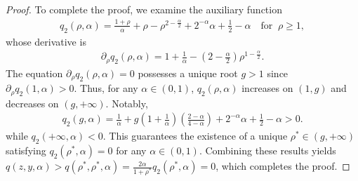 \documentclass{siamart171218}
\theoremstyle{remark}
\theoremstyle{example}
\numberwithin{equation}{section}
\begin{document}
\begin{proof}
To complete the proof, we examine the auxiliary function
\begin{align*}
    q_2(\rho,\alpha)=\frac{1+\rho}{\alpha}+\rho-\rho^{2-\frac{\alpha}{2}}
    +2^{-\alpha}\alpha+\frac{1}{2}-\alpha \quad \text{for}\; \;\rho \ge 1,
\end{align*}
whose derivative is
  \begin{align*}
        \partial_{\rho} q_2(\rho,\alpha) = 1 + \frac{1}{\alpha} - \left(2 - \frac{\alpha}{2}\right) \rho^{1-\frac{\alpha}{2}}.
    \end{align*}
The equation $\partial_{\rho} q_2(\rho,\alpha)=0$ possesses a unique root $g>1$ since $\partial_{\rho} q_2(1,\alpha)>0$. Thus, for any $\alpha \in (0,1)$, $q_2(\rho,\alpha)$ increases on $(1,g)$ and decreases on $(g,+\infty)$. Notably,
\begin{align*}
        q_2(g,\alpha) = \frac{1}{\alpha} + g\left(1 + \frac{1}{\alpha}\right)\left(\frac{2-\alpha}{4-\alpha}\right) + 2^{-\alpha}\alpha + \frac{1}{2} - \alpha > 0.
    \end{align*}
while $q_2(+\infty,\alpha)<0$. This guarantees the existence of a unique $\rho^* \in (g,+\infty)$ satisfying $q_2(\rho^*,\alpha)=0$ for any $\alpha \in (0,1)$.
Combining these results yields $q(z,y,\alpha)>q(\rho^*,\rho^*,\alpha)
=\frac{2\alpha}{1+\rho^*}q_2(\rho^*,\alpha)=0$, which completes the proof.
\end{proof}
\end{document}
